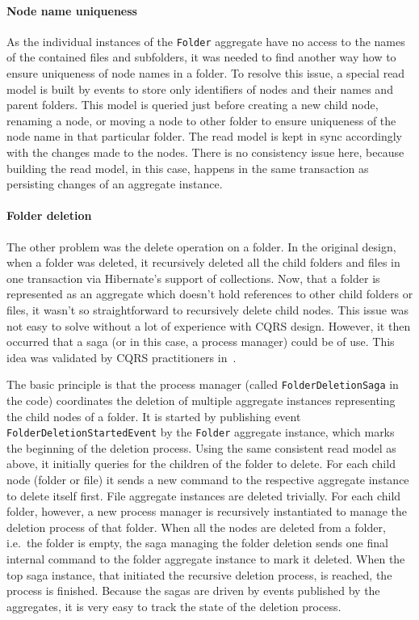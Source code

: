\documentclass{book}
\begin{document}
\paragraph{Node name uniqueness}\label{node-name-uniqueness}

As the individual instances of the \texttt{Folder} aggregate have no
access to the names of the contained files and subfolders, it was needed
to find another way how to ensure uniqueness of node names in a folder.
To resolve this issue, a special read model is built by events to store
only identifiers of nodes and their names and parent folders. This model
is queried just before creating a new child node, renaming a node, or
moving a node to other folder to ensure uniqueness of the node name in
that particular folder. The read model is kept in sync accordingly with
the changes made to the nodes. There is no consistency issue here,
because building the read model, in this case, happens in the same
transaction as persisting changes of an aggregate instance.

\paragraph{Folder deletion}\label{folder-deletion}

The other problem was the delete operation on a folder. In the original
design, when a folder was deleted, it recursively deleted all the child
folders and files in one transaction via Hibernate's support of
collections. Now, that a folder is represented as an aggregate which
doesn't hold references to other child folders or files, it wasn't so
straightforward to recursively delete child nodes. This issue was not
easy to solve without a lot of experience with CQRS design. However, it
then occurred that a saga (or in this case, a process manager) could be
of use. This idea was validated by CQRS practitioners in~\cite{deleting}.

The basic principle is that the process manager (called
\texttt{FolderDeletionSaga} in the code) coordinates the deletion of
multiple aggregate instances representing the child nodes of a folder.
It is started by publishing event \texttt{FolderDeletionStartedEvent} by
the \texttt{Folder} aggregate instance, which marks the beginning of the
deletion process. Using the same consistent read model as above, it
initially queries for the children of the folder to delete. For each
child node (folder or file) it sends a new command to the respective
aggregate instance to delete itself first. File aggregate instances are
deleted trivially. For each child folder, however, a new process manager
is recursively instantiated to manage the deletion process of that
folder. When all the nodes are deleted from a folder, i.e.~the folder is
empty, the saga managing the folder deletion sends one final internal
command to the folder aggregate instance to mark it deleted. When the
top saga instance, that initiated the recursive deletion process, is
reached, the process is finished. Because the sagas are driven by events
published by the aggregates, it is very easy to track the state of the
deletion process.
\end{document}
